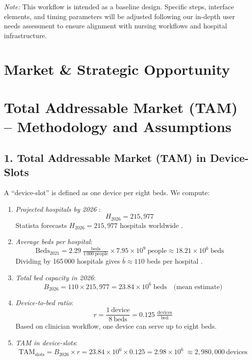 \documentclass[a4paper,11pt]{article}
\begin{document}
\noindent\textit{Note:} This workflow is intended as a baseline design.  Specific steps, interface elements, and timing parameters will be adjusted following our in-depth user needs assessment to ensure alignment with nursing workflows and hospital infrastructure.  



\section{Market \& Strategic Opportunity}

\section{Total Addressable Market (TAM) – Methodology and Assumptions}

\subsection*{1. Total Addressable Market (TAM) in Device-Slots}

A “device-slot” is defined as one device per eight beds. We compute:

\begin{enumerate}
  \item \emph{Projected hospitals by 2026} \cite{NumberHospitalsWorldwide}:
    \[
      H_{2026} = 215{,}977
      \quad
    \]
    Statista forecasts \(H_{2026}=215{,}977\) hospitals worldwide \cite{HospitalBeds1000,nationsWorldPopulationDay}.
  \item \emph{Average beds per hospital}:
    \[
      \text{Beds}_{2021} = 2.29\;\tfrac{\text{beds}}{1\,000\ \text{people}}
      \times 7.95\times10^{9}\;\text{people}
      \approx 18.21\times10^{6}\;\text{beds}
      \quad
    \]
    Dividing by 165\,000 hospitals gives \(\bar b\approx110\) beds per hospital \cite{85HospitalStatistics}.
  \item \emph{Total bed capacity in 2026}:
    \[
      B_{2026}
      = 110 \times 215{,}977
      = 23.84\times10^{6}\;\text{beds}
      \quad\text{(mean estimate)}
    \]
  \item \emph{Device-to-bed ratio}:
    \[
      r = \frac{1\ \text{device}}{8\ \text{beds}} = 0.125\;\tfrac{\text{devices}}{\text{bed}}
    \]
    Based on clinician workflow, one device can serve up to eight beds.
  \item \emph{TAM in device-slots}:
    \[
      \mathrm{TAM}_{\mathrm{slots}}
      = B_{2026} \times r
      = 23.84\times10^{6} \times 0.125
      = 2.98\times10^{6}
      \;\approx2{,}980{,}000\ \text{devices}
    \]

\end{enumerate}
\end{document}
